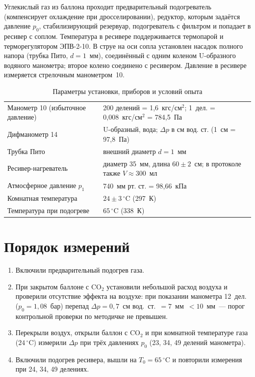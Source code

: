 \documentclass[12pt,a4paper]{article}
\newcommand{\COO}{\mathrm{CO_2}}
\begin{document}
Углекислый газ из баллона проходит предварительный подогреватель
(компенсирует охлаждение при дросселировании), редуктор, которым
задаётся давление $p_0$, стабилизирующий резервуар, подогреватель
с фильтром и попадает в ресивер с соплом. Температура в ресивере
поддерживается термопарой и терморегулятором ЭПВ-2-10. В струе на
оси сопла установлен насадок полного напора (трубка Пито,
$d = 1$~мм), соединённый с одним коленом U-образного водяного
манометра; второе колено соединено с ресивером. Давление в ресивере
измеряется стрелочным манометром~10.

\begin{table}[H]
\centering
\caption{Параметры установки, приборов и условий опыта}
\label{tab:setup}
\begin{tabular}{p{}p{}}
\toprule
Манометр 10 (избыточное давление) & 200 делений = 1,6~кгс/см$^2$; 1~дел. = 0,008~кгс/см$^2$ = 784,5~Па \\
Дифманометр 14 & U-образный, вода; $\Delta p$ в см вод. ст. (1~см = 97,8~Па) \\
Трубка Пито & внешний диаметр $d = 1$~мм \\
Ресивер-нагреватель & диаметр 35~мм, длина $60\pm2$~см; в протоколе также $V\approx300$~мл \\
Атмосферное давление $p_1$ & 740~мм рт. ст. = 98,66~кПа \\
Комнатная температура & $24\pm3\,^\circ$C (297~К) \\
Температура при подогреве & $65\,^\circ$C (338~К) \\
\bottomrule
\end{tabular}
\end{table}

\section{Порядок измерений}

\begin{enumerate}
    \item Включили предварительный подогрев газа.
    \item При закрытом баллоне с $\COO$ установили небольшой расход
          воздуха и проверили отсутствие эффекта на воздухе:
          при показании манометра 12~дел. ($p_0 = 1{,}08$~бар)
          перепад $\Delta p = 0{,}7$~см вод.~ст.~$= 7$~мм~$< 10$~мм~---
          порог контрольной проверки по методичке не превышен.
    \item Перекрыли воздух, открыли баллон с $\COO$ и при комнатной
          температуре газа ($24\,^\circ$C) измерили $\Delta p$ при трёх
          давлениях $p_0$ (23, 34, 49 делений манометра).
    \item Включили подогрев ресивера, вышли на $T_0 = 65\,^\circ$C и
          повторили измерения при 24, 34, 49 делениях.
\end{enumerate}
\end{document}
